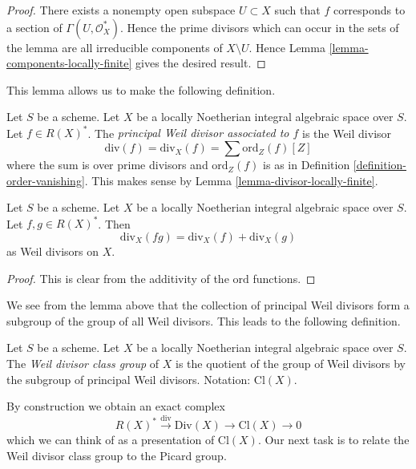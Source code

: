\begin{proof}
There exists a nonempty open subspace $U \subset X$
such that $f$ corresponds to a section of $\Gamma(U, \mathcal{O}_X^*)$.
Hence the prime divisors which can occur in the sets of the lemma are all
irreducible components of $X \setminus U$.
Hence Lemma \ref{lemma-components-locally-finite} gives the desired result.
\end{proof}

\noindent
This lemma allows us to make the following definition.

\begin{definition}
\label{definition-principal-divisor}
Let $S$ be a scheme.
Let $X$ be a locally Noetherian integral algebraic space over $S$.
Let $f \in R(X)^*$.
The {\it principal Weil divisor associated to $f$} is the Weil divisor
$$
\text{div}(f) = \text{div}_X(f) = \sum \text{ord}_Z(f) [Z]
$$
where the sum is over prime divisors and $\text{ord}_Z(f)$ is as in
Definition \ref{definition-order-vanishing}. This makes sense
by Lemma \ref{lemma-divisor-locally-finite}.
\end{definition}

\begin{lemma}
\label{lemma-div-additive}
Let $S$ be a scheme.
Let $X$ be a locally Noetherian integral algebraic space over $S$.
Let $f, g \in R(X)^*$. Then
$$
\text{div}_X(fg) = \text{div}_X(f) + \text{div}_X(g)
$$
as Weil divisors on $X$.
\end{lemma}

\begin{proof}
This is clear from the additivity of the $\text{ord}$ functions.
\end{proof}

\noindent
We see from the lemma above that the collection of principal Weil divisors
form a subgroup of the group of all Weil divisors. This leads to the following
definition.

\begin{definition}
\label{definition-class-group}
Let $S$ be a scheme.
Let $X$ be a locally Noetherian integral algebraic space over $S$. The
{\it Weil divisor class group} of $X$ is the quotient of
the group of Weil divisors by the subgroup of principal Weil divisors.
Notation: $\text{Cl}(X)$.
\end{definition}

\noindent
By construction we obtain an exact complex
\begin{equation}
\label{equation-Weil-divisor-class}
R(X)^* \xrightarrow{\text{div}} \text{Div}(X) \to \text{Cl}(X) \to 0
\end{equation}
which we can think of as a presentation of $\text{Cl}(X)$. Our next task
is to relate the Weil divisor class group to the Picard group.









